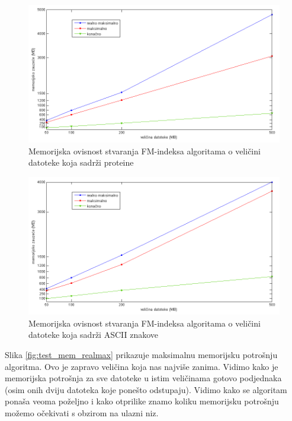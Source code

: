 \begin{figure}[H]
   \centering
       \includegraphics[width=\textwidth]{./pictures/test_mem_proteini.png}
 \caption{Memorijska ovisnost stvaranja FM-indeksa algoritama o veličini datoteke koja sadrži proteine}
 \label{fig:test_mem_proteini}
\end{figure}

\begin{figure}[H]
   \centering
       \includegraphics[width=\textwidth]{./pictures/test_mem_ascii.png}
 \caption{Memorijska ovisnost stvaranja FM-indeksa algoritama o veličini datoteke koja sadrži ASCII znakove}
 \label{fig:test_mem_ascii}
\end{figure}

Slika  \ref{fig:test_mem_realmax} prikazuje maksimalnu memorijsku potrošnju algoritma. Ovo je zapravo veličina koja nas najviše zanima. Vidimo kako je memorijska potrošnja za sve datoteke u istim veličinama gotovo podjednaka (osim onih dviju datoteka koje ponešto odstupaju). Vidimo kako se algoritam ponaša veoma poželjno i kako otprilike znamo koliku memorijsku potrošnju možemo očekivati s obzirom na ulazni niz.

